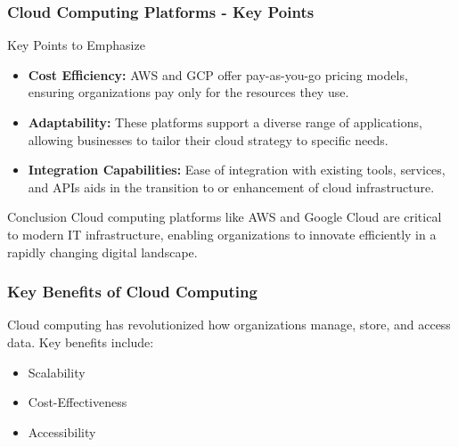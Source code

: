 \documentclass[aspectratio=169]{beamer}
\begin{document}
\begin{frame}[fragile]
    \frametitle{Cloud Computing Platforms - Key Points}
    \begin{block}{Key Points to Emphasize}
        \begin{itemize}
            \item \textbf{Cost Efficiency:} AWS and GCP offer pay-as-you-go pricing models, ensuring organizations pay only for the resources they use.
            \item \textbf{Adaptability:} These platforms support a diverse range of applications, allowing businesses to tailor their cloud strategy to specific needs.
            \item \textbf{Integration Capabilities:} Ease of integration with existing tools, services, and APIs aids in the transition to or enhancement of cloud infrastructure.
        \end{itemize}
    \end{block}

    \begin{block}{Conclusion}
        Cloud computing platforms like AWS and Google Cloud are critical to modern IT infrastructure, enabling organizations to innovate efficiently in a rapidly changing digital landscape.
    \end{block}
\end{frame}

\begin{frame}[fragile]
    \frametitle{Key Benefits of Cloud Computing}
    Cloud computing has revolutionized how organizations manage, store, and access data. Key benefits include:
    \begin{itemize}
        \item Scalability
        \item Cost-Effectiveness
        \item Accessibility
    \end{itemize}
\end{frame}
\end{document}
